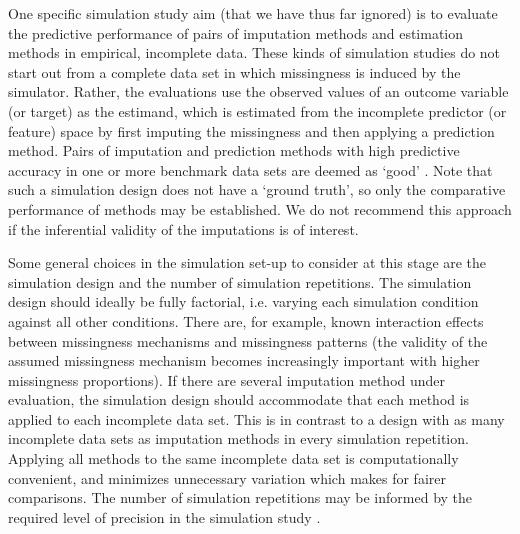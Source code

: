 \documentclass[bimj,fleqn]{w-art}
\begin{document}
One specific simulation study aim (that we have thus far ignored) is to evaluate the predictive performance of pairs of imputation methods and estimation methods in empirical, incomplete data. These kinds of simulation studies do not start out from a complete data set in which missingness is induced by the simulator. Rather, the evaluations use the observed values of an outcome variable (or target) as the estimand, which is estimated from the incomplete predictor (or feature) space by first imputing the missingness and then applying a prediction method. Pairs of imputation and prediction methods with high predictive accuracy in one or more benchmark data sets are deemed as `good' \citep{liu21}. Note that such a simulation design does not have a `ground truth', so only the comparative performance of methods may be established. We do not recommend this approach if the inferential validity of the imputations is of interest.


Some general choices in the simulation set-up to consider at this stage are the simulation design and the number of simulation repetitions. The simulation design should ideally be fully factorial, i.e. varying each simulation condition against all other conditions. There are, for example, known interaction effects between missingness mechanisms and missingness patterns (the validity of the assumed missingness mechanism becomes increasingly important with higher missingness proportions). If there are several imputation method under evaluation, the simulation design should accommodate that each method is applied to each incomplete data set. This is in contrast to a design with as many incomplete data sets as imputation methods in every simulation repetition. Applying all methods to the same incomplete data set is computationally convenient, and minimizes unnecessary variation which makes for fairer comparisons. The number of simulation repetitions may be informed by the required level of precision in the simulation study \citep[e.g. as determined from a maximum tolerable level of uncertainty in terms of a performance measure's Monte Carlo error][]{morr18}. 
\end{document}
